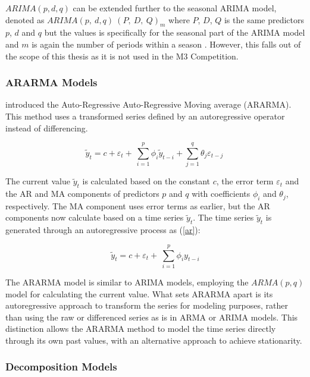 \documentclass[12pt,a4paper]{article}
\begin{document}
$ARIMA(p, d, q)$ can be extended further to the seasonal ARIMA model, denoted as $ARIMA\left(p,\ d,q\right){\ \left(P,\ D,\ Q\right)}_m$ where $P$, $D$, $Q$ is the same predictors $p$, $d$ and $q$ but the values is specifically for the seasonal part of the ARIMA model and $m$ is again the number of periods within a season \parencite{HyndmanForecasting2021}. However, this falls out of the scope of this thesis as it is not used in the M3 Competition. 

\subsubsection{ARARMA Models}
\cite{Parzen1982} introduced the Auto-Regressive Auto-Regressive Moving average (ARARMA). This method uses a transformed series defined by an autoregressive operator instead of differencing. 

\begin{equation}
  {\widetilde{y}}_t=c+\varepsilon_t+\ \sum_{i=1}^{p}{\phi_i{\widetilde{y}}_{t-i}}+\sum_{j=1}^{q}{\theta_j\varepsilon_{t-j}\ }
  \label{ararma}
\end{equation}

The current value ${\widetilde{y}}_t$ is calculated based on the constant $c$, the error term $\varepsilon_t$ and the AR and MA components of predictors $p$ and $q$ with coefficients $\phi_i$ and $\theta_j$, respectively. The MA component uses error terms as earlier, but the AR components now calculate based on a time series ${\widetilde{y}}_t$. The time series ${\widetilde{y}}_t$ is generated through an autoregressive process as (\ref{ar}):

\begin{equation}
  {\widetilde{y}}_t=c+\varepsilon_t+\ \sum_{i=1}^{p}{\phi_iy_{t-i}}
  \label{ar2}
\end{equation}

The ARARMA model is similar to ARIMA models, employing the $ARMA(p, q)$ model for calculating the current value. What sets ARARMA apart is its autoregressive approach to transform the series for modeling purposes, rather than using the raw or differenced series as is in ARMA or ARIMA models. This distinction allows the ARARMA method to model the time series directly through its own past values, with an alternative approach to achieve stationarity.

\subsubsection{Decomposition Models}
\end{document}
